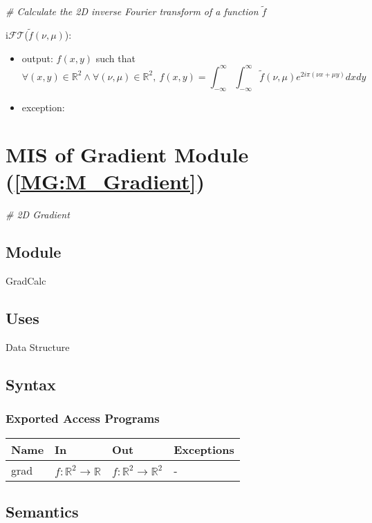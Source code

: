 \documentclass[12pt, titlepage]{article}
\begin{document}
\noindent\textit{{\#} Calculate the 2D inverse Fourier transform of a function $\widetilde{f}$}\medskip

\noindent i$\mathcal{FT}$($\widetilde{f}(\nu,\mu)$):
\begin{itemize} 
\item output: $f(x,y)$ such that 
\begin{equation*}
\forall (x,y) \in \mathbb{R}^2 \wedge \forall (\nu,\mu) \in \mathbb{R}^2 , \ f(x,y)=\int_{-\infty}^{\infty}\int_{-\infty}^{\infty}\widetilde{f}(\nu,\mu)e^{2i\pi(\nu x+\mu y)}dxdy
\end{equation*}
\item exception:  
\end{itemize}

\section{MIS of Gradient Module (\texorpdfstring{\cref{MG:M_Gradient}}))} \label{MIS_Gradient}

\textit{{\#} 2D Gradient} \medskip

\subsection{Module}
GradCalc
\subsection{Uses}
Data Structure
\subsection{Syntax}

\subsubsection{Exported Access Programs}
\begin{center}
\begin{tabular}{p{2cm} p{4cm} p{4cm} p{2cm}}
\hline
\textbf{Name} & \textbf{In} & \textbf{Out} & \textbf{Exceptions} \\
\hline
grad & $f:\mathbb{R}^2\rightarrow\mathbb{R}$  & $f:\mathbb{R}^2\rightarrow\mathbb{R}^2$ & -\\
\hline
\end{tabular}
\end{center}

\subsection{Semantics}
\end{document}
